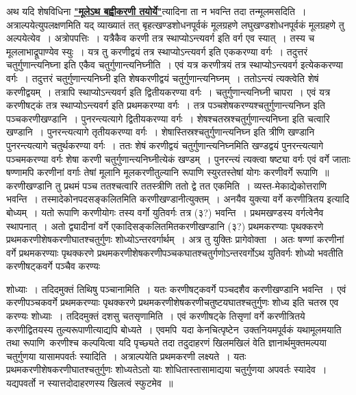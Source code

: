\documentclass[11pt, openany]{book}
\begin{document}
\vspace{-3mm}
 अथ यदि शेषविधिना \hyperref[20]{\textbf{"मूलेऽथ बह्वीकरणी तयोर्ये"}}त्यादिना ता न भवन्ति तदा तन्मूलमसदिति~। अत्राल्पयेत्युपलक्षणमिति यद् व्याख्यातं तत्
\newpage
\noindent बृहत्खण्डशोधनपूर्वकं मूलग्रहणे लघुखण्डशोधनपूर्वकं मूलग्रहणे तु
अल्पयेत्येव~। अत्रोपपत्तिः~। यत्रैकैव करणी तत्र स्थाप्योऽन्त्यवर्ग इति वर्ग एव स्यात्~। तस्य च मूललाभाद्रूपाण्येव स्युः~। यत्र तु करणीद्वयं तत्र
स्थाप्योऽन्त्यवर्ग इति एककरण्या वर्गः~। तदुत्तरं चतुर्गुणान्त्यनिघ्ना इति एकैव
चतुर्गुणान्त्यनिघ्नीति~। एवं यत्र करणीत्रयं तत्र स्थाप्योऽन्त्यवर्ग \;इत्येककरण्या \;वर्गः~। \;तदुत्तरं \;चतुर्गुणान्त्यनिघ्नी \;इति \;शेषकरणीद्वयं चतुर्गुणान्त्यनिघ्नम्~। ततोऽन्त्यं त्यक्त्वेति शेषं करणीद्वयम्~। तत्रापि स्थाप्योऽन्त्यवर्ग इति द्वितीयकरण्या वर्गः~। चतुर्गुणान्त्यनिघ्नी चापरा~। एवं यत्र करणीषट्कं तत्र स्थाप्योऽन्त्यवर्ग इति प्रथमकरण्या वर्गः~। तत्र पञ्चशेषकरण्यश्चतुर्गुणान्त्यनिघ्न इति
पञ्चकरणीखण्डानि~। पुनरन्त्यत्यागे द्वितीयकरण्या वर्गः~। शेषश्चतस्रश्चतुर्गुणान्त्यनिघ्ना 
इति चत्वारि खण्डानि~। पुनरन्त्यत्यागे \;तृतीयकरण्या \;वर्गः~। \;शेषास्तिस्रश्चतुर्गुणान्त्यनिघ्न \;इति \;त्रीणि \;खण्डानि पुनरन्त्यत्यागे चतुर्थकरण्या वर्गः~। ततः शेषं करणीद्वयं चतुर्गुणान्त्यनिघ्नमिति खण्डद्वयं पुनरन्त्यत्यागे
पञ्चमकरण्या वर्गः शेषा करणी चतुर्गुणान्त्यनिघ्नीत्येकं खण्डम्~। पुनरन्त्यं त्यक्त्वा
षष्ट्या वर्गः एवं वर्गे जाताः षण्णामपि करणीनां वर्गाः तेषां मूलानि मूलकरणीतुल्यानि 
रूपाणि स्युरतस्तेषां योगः करणीवर्गे रूपाणि~॥ \\

\vspace{-3mm}
 करणीखण्डानि तु प्रथमं पञ्च ततश्चत्वारि ततस्त्रीणि ततो द्वे तत 
एकमिति~। व्यस्त-मेकाद्येकोत्तराणि भवन्ति~। तस्मादेकोनपदसङ्कलितमिति 
करणीखण्डानीत्युक्तम्~। अनयैव युक्त्या वर्गे करणीत्रितय इत्यादि बोध्यम्~।
यतो रूपाणि करणीयोगः तस्य वर्गो युतिवर्गः तत्र (३?) भवन्ति~। 
प्रथमखण्डस्य वर्गत्वेनैव स्थापनात्~। अतो द्व्यादीनां वर्गे एकादिसङ्कलितमितकरणीखण्डानि (३?) प्रथमकरण्याः पृथक्करणे प्रथमकरणीशेषकरणीघातश्चतुर्गुणः शोध्योऽन्तरवर्गार्थम्~। अत्र तु युक्तिः प्रागेवोक्ता~। अतः षण्णां करणीनां वर्गे प्रथमकरण्याः पृथक्करणे प्रथमकरणीशेषकरणीपञ्चकघातश्चतुर्गणोऽन्तरवर्गोऽथ युतिवर्गः शोध्यो भवतीति करणीषट्कवर्गे पञ्चैव करण्यः
\newpage%

\noindent शोध्याः~। तदिदमुक्तं तिथिषु पञ्चानामिति~। यतः करणीषट्कवर्गे पञ्चदशैव 
करणीखण्डानि भवन्ति~। एवं करणीपञ्चकवर्गे प्रथमकरण्याः पृथक्करणे 
प्रथमकरणीशेषकरणीचतुष्टयघातश्चतुर्गुणः शोध्य इति चतस्र एव 
करण्यः शोध्याः~। तदिदमुक्तं दशसु चतसृणामिति~। एवं करणीषट्के 
तिसृणां वर्गे करणीत्रितये करणीद्वितयस्य तुल्यरूपाणीत्याद्यपि बोध्यते~।
एवमपि \,यदा \;केनचित्पृष्टेन \,उक्तनियमपूर्वकं \;यथामूलमयाति \,तथा \;रूपाणि \,करणीश्च कल्पयित्वा यदि पृच्छ्यते तदा तदुदाहरणं खिलमखिलं 
वेति ज्ञानार्थमुक्तमल्पया चतुर्गुणया यासामपवर्तः स्यादिति~। अत्राल्पयेति
प्रथमकरणी लक्ष्यते~। यतः प्रथमकरणीशेषकरणीघातश्चतुर्गुणः शोध्यतेऽतो याः शोधितास्तासामाद्यया चतुर्गुणया अपवर्तः स्यादेव~। यद्यपवर्तो 
न स्यात्तदोदाहरणस्य खिलत्वं स्फुटमेव~॥ \\
\end{document}
